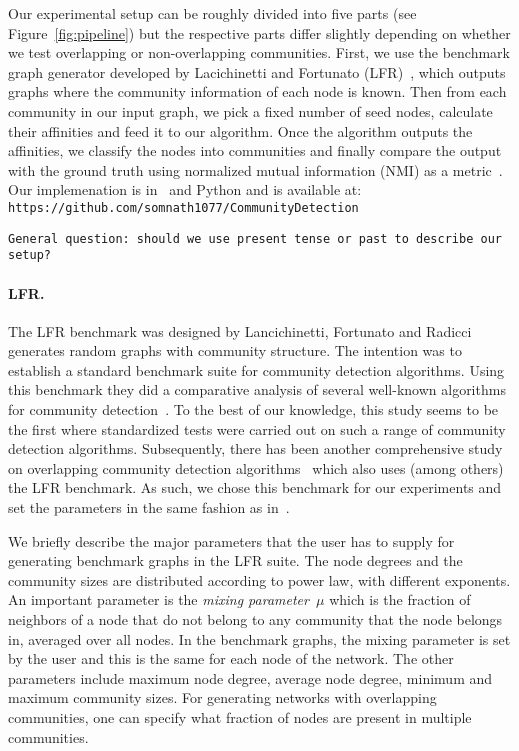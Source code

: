 Our experimental setup can be roughly divided into five parts (see Figure~\ref{fig:pipeline}) but the 
respective parts differ slightly depending on whether we test overlapping or non-overlapping 
communities. First, we use the benchmark graph generator developed by Lacichinetti and Fortunato 
(LFR)~\cite{LFR08, LF09}, which outputs graphs where the community information of each node 
is known. Then from each community in our input graph, we pick a fixed number of seed nodes, 
calculate their affinities and feed it to our algorithm. Once the algorithm outputs the 
affinities, we classify the nodes into communities and finally compare the output 
with the ground truth using normalized mutual information (NMI) as a metric~\cite{DDDA05}.
Our implemenation is in \CPP\ and Python and is available at: 
\texttt{https://github.com/somnath1077/CommunityDetection}

\texttt{General question: should we use present tense or past to describe our setup?}

\paragraph{LFR.}
The LFR benchmark was designed by Lancichinetti, Fortunato and Radicci~\cite{LFR08}
generates random graphs with community structure. The intention was to establish a 
standard benchmark suite for community detection algorithms. Using this benchmark they 
did a comparative analysis of several well-known algorithms
for community detection~\cite{LF09}. To the best of our knowledge, this study seems to be the 
first where standardized tests were carried out on such a range of community detection algorithms. 
Subsequently, there has been another comprehensive study on overlapping community detection 
algorithms~\cite{XKS13} which also uses (among others) the LFR benchmark. As such, we chose this 
benchmark for our experiments and set the parameters in the same fashion as in~\cite{LF09}. 

We briefly describe the major parameters that the user has to supply 
for generating benchmark graphs in the LFR suite. The node degrees and the 
community sizes are distributed according to power law, with different exponents. 
An important parameter is the \emph{mixing parameter~$\mu$} which is the fraction of neighbors 
of a node that do not belong to any community that the node belongs in, averaged over all nodes.
In the benchmark graphs, the mixing parameter is set by the user and this is the same for each 
node of the network. The other parameters include maximum node degree, average node degree, 
minimum and maximum community sizes. For generating networks with overlapping communities, 
one can specify what fraction of nodes are present in multiple communities.



